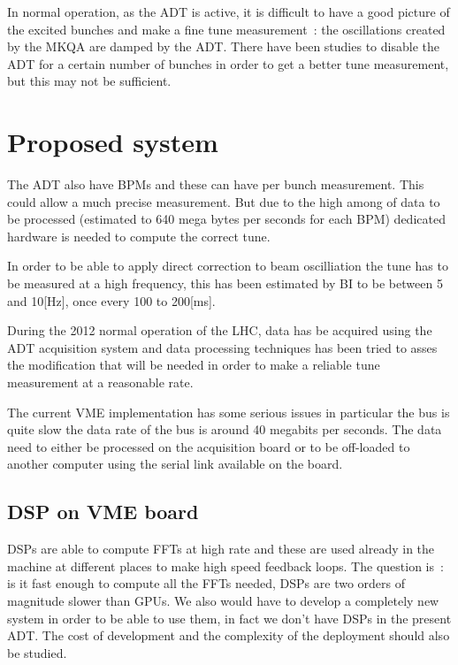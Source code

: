 In normal operation, as the \gls{ADT} is active, it is difficult to have a good picture of the excited bunches and make a fine tune measurement~: the oscillations created by the \gls{MKQA} are damped by the \gls{ADT}. There have been studies to disable the \gls{ADT} for a certain number of bunches in order to get a better tune measurement\cite{HofleEvian11}, but this may not be sufficient.

\section{Proposed system}

The \gls{ADT} also have \glspl{BPM} and these can have per bunch measurement\cite{BphMeas07}. This could allow a much precise measurement. But due to the high among of data to be processed (estimated to 640 mega bytes per seconds for each \gls{BPM}) dedicated hardware is needed to compute the correct tune\cite{HofleChamonix12}.

In order to be able to apply direct correction to beam oscilliation the \gls{tune} has to be measured at a high frequency, this has been estimated by \gls{BI} to be between 5 and 10[Hz], once every 100 to 200[ms].

During the 2012 normal operation of the \gls{LHC}, data has be acquired using the \gls{ADT} acquisition system and data processing techniques has been tried to asses the modification that will be needed in order to make a reliable \gls{tune} measurement at a reasonable rate\cite{HofleChamonix12}.

The current \gls{VME} implementation has some serious issues in particular the bus is quite slow the data rate of the bus is around 40 megabits per seconds. The data need to either be processed on the acquisition board or to be off-loaded to another computer using the serial link available on the board\cite{Baudrenghien:1124094}.

\subsection{DSP on VME board}

\Glspl{DSP} are able to compute \glspl{FFT} at high rate and these are used already in the machine at different places to make high speed feedback loops. The question is~: is it fast enough to compute all the \glspl{FFT} needed, \glspl{DSP} are two orders of magnitude slower than \glspl{GPU}. We also would have to develop a completely new system in order to be able to use them, in fact we don't have \glspl{DSP} in the present \gls{ADT}. The cost of development and the complexity of the deployment should also be studied.

